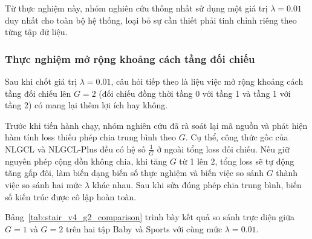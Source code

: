 Từ thực nghiệm này, nhóm nghiên cứu thống nhất sử dụng một giá trị $\lambda = 0.01$ duy nhất cho toàn bộ hệ thống, loại bỏ sự cần thiết phải tinh chỉnh riêng theo từng tập dữ liệu.

\subsubsection{Thực nghiệm mở rộng khoảng cách tầng đối chiếu}

Sau khi chốt giá trị $\lambda = 0.01$, câu hỏi tiếp theo là liệu việc mở rộng khoảng cách tầng đối chiếu lên $G=2$ (đối chiếu đồng thời tầng 0 với tầng 1 và tầng 1 với tầng 2) có mang lại thêm lợi ích hay không.

Trước khi tiến hành chạy, nhóm nghiên cứu đã rà soát lại mã nguồn và phát hiện hàm tính loss thiếu phép chia trung bình theo $G$. Cụ thể, công thức gốc của NLGCL và NLGCL-Plus đều có hệ số $\frac{1}{G}$ ở ngoài tổng loss đối chiếu. Nếu giữ nguyên phép cộng dồn không chia, khi tăng $G$ từ 1 lên 2, tổng loss sẽ tự động tăng gấp đôi, làm biến dạng biến số thực nghiệm và biến việc so sánh $G$ thành việc so sánh hai mức $\lambda$ khác nhau. Sau khi sửa đúng phép chia trung bình, biến số kiến trúc được cô lập hoàn toàn.

Bảng~\ref{tab:stair_v4_g2_comparison} trình bày kết quả so sánh trực diện giữa $G=1$ và $G=2$ trên hai tập Baby và Sports với cùng mức $\lambda = 0.01$.

